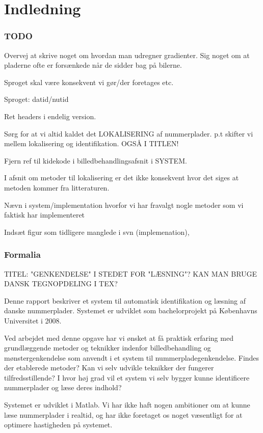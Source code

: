 \section{Indledning}

\subsubsection*{TODO}
Overvej at skrive noget om hvordan man udregner gradienter.
Sig noget om at pladerne ofte er forsænkede når de sidder bag på bilerne.

Sproget skal være konsekvent vi gør/der foretages etc.

Sproget: datid/nutid

Ret headers i endelig version.

Sørg for at vi altid kaldet det LOKALISERING af nummerplader. p.t skifter vi mellem lokalisering og identifikation. OGSÅ I TITLEN!


Fjern ref til kidekode i billedbehandlingsafsnit i SYSTEM.

I afsnit om metoder til lokalisering er det ikke konsekvent hvor det siges at metoden kommer fra litteraturen.

Nævn i system/implementation hvorfor vi har fravalgt nogle metoder som vi faktisk har implementeret

Indsæt figur som tidligere manglede i svn (implemenation),

\subsubsection*{Formalia}

TITEL: "GENKENDELSE" I STEDET FOR "LÆSNING"?
KAN MAN BRUGE DANSK TEGNOPDELING I TEX?

Denne rapport beskriver et system til automatisk identifikation og læsning af danske nummerplader. Systemet er udviklet som bachelorprojekt på Københavns Universitet i 2008.

Ved arbejdet med denne opgave har vi ønsket at få praktisk erfaring med grundlæggende metoder og teknikker indenfor billedbehandling og mønstergenkendelse som anvendt i et system til nummerpladegenkendelse. Findes der etablerede metoder? Kan vi selv udvikle teknikker der fungerer tilfredsstillende? I hvor høj grad vil et system vi selv bygger kunne identificere nummerplader og læse deres indhold?

Systemet er udviklet i Matlab. Vi har ikke haft nogen ambitioner om at kunne læse nummerplader i realtid, og har ikke foretaget os noget væsentligt for at optimere hastigheden på systemet.


